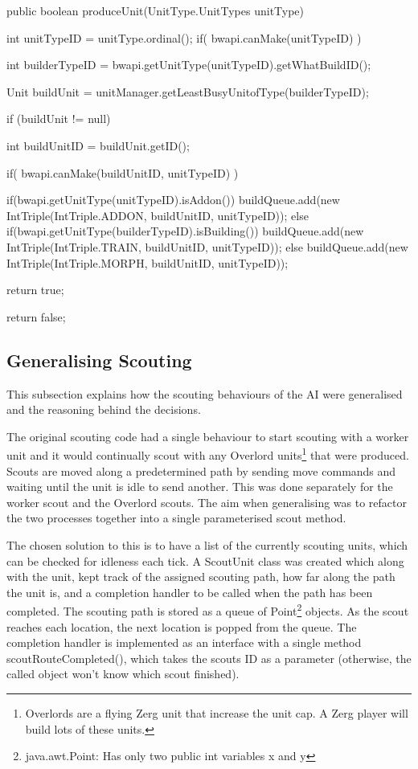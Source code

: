 \documentclass[11pt,openright,a4paper]{report}
\begin{document}
\begin{Code}[frame=single,language=Java,tabsize=4,breaklines,breakatwhitespace,caption={The current method to produce any unit in the game. IntTriple is a custom type that simply contains three public integers.},label=produceUnit]
public boolean produceUnit(UnitType.UnitTypes unitType){
	int unitTypeID = unitType.ordinal();
	if( bwapi.canMake(unitTypeID) ){
		int builderTypeID = bwapi.getUnitType(unitTypeID).getWhatBuildID();
		
        Unit buildUnit = unitManager.getLeastBusyUnitofType(builderTypeID);
		
		if (buildUnit != null){
			int buildUnitID = buildUnit.getID();
			
			if( bwapi.canMake(buildUnitID, unitTypeID) ){					
				if(bwapi.getUnitType(unitTypeID).isAddon()){
					buildQueue.add(new IntTriple(IntTriple.ADDON, buildUnitID, unitTypeID));
				}
				else if(bwapi.getUnitType(builderTypeID).isBuilding()){
					buildQueue.add(new IntTriple(IntTriple.TRAIN, buildUnitID, unitTypeID));
				}
				else{
					buildQueue.add(new IntTriple(IntTriple.MORPH, buildUnitID, unitTypeID));
				}
				
				return true;
			}
		}
	}
	return false;
}
\end{Code}

\subsection{Generalising Scouting}
This subsection explains how the scouting behaviours of the AI were generalised and the reasoning behind the decisions.

The original scouting code had a single behaviour to start scouting with a worker unit and it would continually scout with any Overlord units\footnote{Overlords are a flying Zerg unit that increase the unit cap. A Zerg player will build lots of these units.} that were produced. Scouts are moved along a predetermined path by sending move commands and waiting until the unit is idle to send another. This was done separately for the worker scout and the Overlord scouts. The aim when generalising was to refactor the two processes together into a single parameterised scout method.

The chosen solution to this is to have a list of the currently scouting units, which can be checked for idleness each tick. A ScoutUnit class was created which along with the unit, kept track of the assigned scouting path, how far along the path the unit is, and a completion handler to be called when the path has been completed. The scouting path is stored as a queue of Point\footnote{java.awt.Point: Has only two public int variables x and y} objects. As the scout reaches each location, the next location is popped from the queue. The completion handler is implemented as an interface with a single method scoutRouteCompleted(), which takes the scouts ID as a parameter (otherwise, the called object won't know which scout finished).
\end{document}
